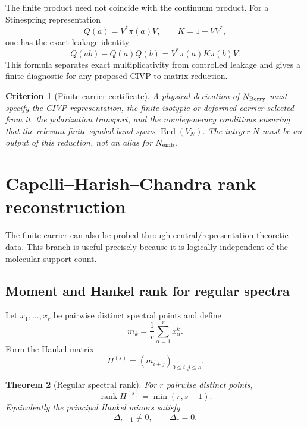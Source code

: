 \documentclass[aps,prd,preprint,nofootinbib,superscriptaddress]{revtex4-2}
\newtheorem{theorem}{Theorem}[section]
\newtheorem{criterion}[theorem]{Criterion}
\theoremstyle{definition}
\theoremstyle{remark}
\newcommand{\rankop}{\operatorname{rank}}
\begin{document}
The finite product need not coincide with the continuum product.  For a Stinespring representation
\begin{equation}
Q(a)=V^*\pi(a)V,
\qquad
K=1-VV^*,
\end{equation}
one has the exact leakage identity
\begin{equation}
Q(ab)-Q(a)Q(b)
=
V^*\pi(a)K\pi(b)V.
\label{eq:leakage}
\end{equation}
This formula separates exact multiplicativity from controlled leakage and gives a finite diagnostic for any proposed CIVP-to-matrix reduction.

\begin{criterion}[Finite-carrier certificate]
\label{crit:finitecarrier}
A physical derivation of $N_{\rm Berry}$ must specify the CIVP representation, the finite isotypic or deformed carrier selected from it, the polarization transport, and the nondegeneracy conditions ensuring that the relevant finite symbol band spans $\operatorname{End}(V_N)$.  The integer $N$ must be an output of this reduction, not an alias for $N_{\rm emb}$.
\end{criterion}

\section{Capelli--Harish--Chandra rank reconstruction}
\label{sec:capelli}

The finite carrier can also be probed through central/representation-theoretic data.  This branch is useful precisely because it is logically independent of the molecular support count.

\subsection{Moment and Hankel rank for regular spectra}

Let $x_1,\ldots,x_r$ be pairwise distinct spectral points and define
\begin{equation}
m_k
=
\frac1r\sum_{\alpha=1}^{r}x_\alpha^k.
\label{eq:moments}
\end{equation}
Form the Hankel matrix
\begin{equation}
H^{(s)}=(m_{i+j})_{0\le i,j\le s}.
\label{eq:hankel}
\end{equation}

\begin{theorem}[Regular spectral rank]
\label{thm:hankelrank}
For $r$ pairwise distinct points,
\begin{equation}
\rankop H^{(s)}=\min(r,s+1).
\label{eq:hankelrank}
\end{equation}
Equivalently the principal Hankel minors satisfy
\begin{equation}
\Delta_{r-1}\neq0,
\qquad
\Delta_r=0.
\label{eq:hankelminors}
\end{equation}
\end{theorem}
\end{document}
